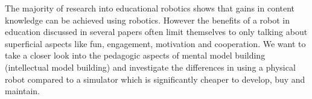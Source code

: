 \bigskip\noindent
The majority of research into educational robotics shows that gains in content knowledge can be achieved using robotics. 
However the benefits of a robot in education discussed in several papers often limit themselves to only talking about superficial aspects like fun, engagement, motivation and cooperation. 
We want to take a closer look into the pedagogic aspects of mental model building (intellectual model building) and investigate the differences in using a physical robot compared to a simulator which is significantly cheaper to develop, buy and maintain.%


